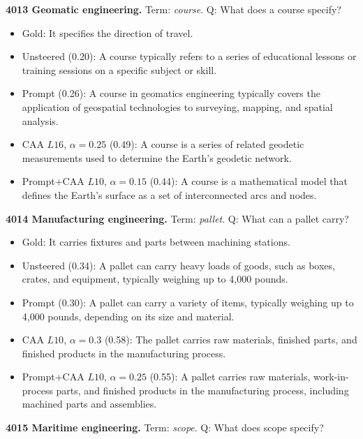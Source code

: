 \medskip\noindent\textbf{4013 Geomatic engineering.} Term: \emph{course}.
Q: What does a course specify?
\begin{itemize}\setlength{\itemsep}{0.15em}\setlength{\parsep}{0pt}\setlength{\topsep}{0.2em}
\item Gold: It specifies the direction of travel.
\item Unsteered (0.20): A course typically refers to a series of educational lessons or training sessions on a specific subject or skill.
\item Prompt (0.26): A course in geomatics engineering typically covers the application of geospatial technologies to surveying, mapping, and spatial analysis.
\item CAA $L16$, $\alpha=0.25$ (0.49): A course is a series of related geodetic measurements used to determine the Earth's geodetic network.
\item Prompt+CAA $L10$, $\alpha=0.15$ (0.44): A course is a mathematical model that defines the Earth's surface as a set of interconnected arcs and nodes.
\end{itemize}
\medskip\noindent\textbf{4014 Manufacturing engineering.} Term: \emph{pallet}.
Q: What can a pallet carry?
\begin{itemize}\setlength{\itemsep}{0.15em}\setlength{\parsep}{0pt}\setlength{\topsep}{0.2em}
\item Gold: It carries fixtures and parts between machining stations.
\item Unsteered (0.34): A pallet can carry heavy loads of goods, such as boxes, crates, and equipment, typically weighing up to 4,000 pounds.
\item Prompt (0.30): A pallet can carry a variety of items, typically weighing up to 4,000 pounds, depending on its size and material.
\item CAA $L10$, $\alpha=0.3$ (0.58): The pallet carries raw materials, finished parts, and finished products in the manufacturing process.
\item Prompt+CAA $L10$, $\alpha=0.25$ (0.55): A pallet carries raw materials, work-in-process parts, and finished products in the manufacturing process, including machined parts and assemblies.
\end{itemize}
\medskip\noindent\textbf{4015 Maritime engineering.} Term: \emph{scope}.
Q: What does scope specify?
